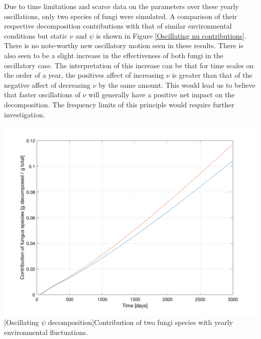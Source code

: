 \documentclass[12pt]{article}
\newenvironment{ColumnFigure}
{\par\medskip\noindent\minipage{\linewidth}}
{\endminipage\par\medskip}
\begin{document}
\begin{multicols}{2}
Due to time limitations and scarce data on the parameters over these yearly oscillations, only two species of fungi were simulated. A comparison of their respective decomposition contributions with that of similar environmental conditions but static $\nu$ and $\psi$ is shown in Figure \ref{Oscillating nu contributions}. There is no note-worthy new oscillatory motion seen in these results. There is also seen to be a slight increase in the effectiveness of both fungi in the oscillatory case. The interpretation of this increase can be that for time scales on the order of a year, the positives affect of increasing $\nu$ is greater than that of the negative affect of decreasing $\nu$ by the same amount. This would lead us to believe that faster oscillations of $\nu$ will generally have a positive net impact on the decomposition. The frequency limits of this principle would require further investigation.

\begin{ColumnFigure}\label{Oscillating nu contributions}
	\centering
	\includegraphics[width=\linewidth]{oscillating_psi_contribution.png}
	[Oscillating $\psi$ decomposition]{Contribution of two fungi species with yearly environmental fluctuations.}
\end{ColumnFigure}


\end{multicols}
\end{document}
